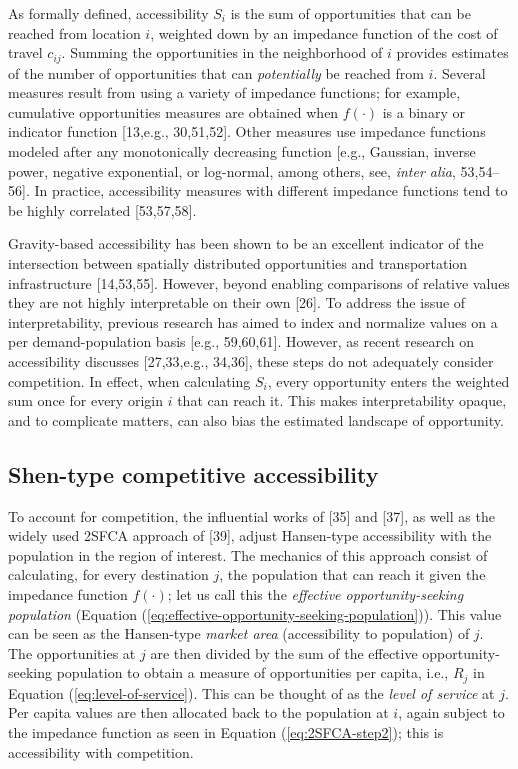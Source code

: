 \documentclass[10pt,letterpaper]{article}
\begin{document}
As formally defined, accessibility \(S_i\) is the sum of opportunities
that can be reached from location \(i\), weighted down by an impedance
function of the cost of travel \(c_{ij}\). Summing the opportunities in
the neighborhood of \(i\) provides estimates of the number of
opportunities that can \emph{potentially} be reached from \(i\). Several
measures result from using a variety of impedance functions; for
example, cumulative opportunities measures are obtained when
\(f(\cdot)\) is a binary or indicator function {[}13,e.g., 30,51,52{]}.
Other measures use impedance functions modeled after any monotonically
decreasing function {[}e.g., Gaussian, inverse power, negative
exponential, or log-normal, among others, see, \emph{inter alia},
53,54--56{]}. In practice, accessibility measures with different
impedance functions tend to be highly correlated {[}53,57,58{]}.

Gravity-based accessibility has been shown to be an excellent indicator
of the intersection between spatially distributed opportunities and
transportation infrastructure {[}14,53,55{]}. However, beyond enabling
comparisons of relative values they are not highly interpretable on
their own {[}26{]}. To address the issue of interpretability, previous
research has aimed to index and normalize values on a per
demand-population basis {[}e.g., 59,60,61{]}. However, as recent
research on accessibility discusses {[}27,33,e.g., 34,36{]}, these steps
do not adequately consider competition. In effect, when calculating
\(S_i\), every opportunity enters the weighted sum once for every origin
\(i\) that can reach it. This makes interpretability opaque, and to
complicate matters, can also bias the estimated landscape of
opportunity.

\hypertarget{shen-type-competitive-accessibility}{%
\subsection{Shen-type competitive
accessibility}\label{shen-type-competitive-accessibility}}

To account for competition, the influential works of {[}35{]} and
{[}37{]}, as well as the widely used 2SFCA approach of {[}39{]}, adjust
Hansen-type accessibility with the population in the region of interest.
The mechanics of this approach consist of calculating, for every
destination \(j\), the population that can reach it given the impedance
function \(f(\cdot)\); let us call this the \emph{effective
opportunity-seeking population} (Equation
(\ref{eq:effective-opportunity-seeking-population})). This value can be
seen as the Hansen-type \emph{market area} (accessibility to population)
of \(j\). The opportunities at \(j\) are then divided by the sum of the
effective opportunity-seeking population to obtain a measure of
opportunities per capita, i.e., \(R_j\) in Equation
(\ref{eq:level-of-service}). This can be thought of as the \emph{level
of service} at \(j\). Per capita values are then allocated back to the
population at \(i\), again subject to the impedance function as seen in
Equation (\ref{eq:2SFCA-step2}); this is accessibility with competition.
\end{document}
